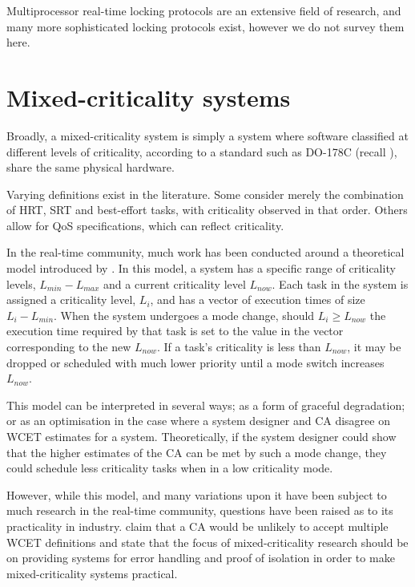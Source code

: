 Multiprocessor real-time locking protocols are an extensive field of research, and 
many more sophisticated locking protocols exist, however we do not survey them here.

\section{Mixed-criticality systems}
\label{s:mixed-criticality}

Broadly, a mixed-criticality system is simply a system where software classified at different levels
of criticality, according to a standard such as DO-178C (recall ), share
the same physical hardware. 

Varying definitions exist in the literature. Some consider merely
the combination of \gls{HRT}, \gls{SRT} and best-effort tasks, with criticality observed in that order.
Others allow for \gls{QoS} specifications, which can reflect criticality. 

In the real-time community, much work has been
conducted around a theoretical model introduced by \citet{Vestal_07}. In this model, a system has
a specific range of criticality levels, $L_{min}-L_{max}$ and a current criticality level
$L_{now}$. Each task in the system is assigned a criticality level, $L_{i}$, and has a vector of
execution times of size $L_{i}-L_{min}$. When the system undergoes a mode change, should $L_{i}
\geq L_{now}$ the execution time required by that task is set to the value in the vector
corresponding to the new $L_{now}$. If a task's criticality is less than $L_{now}$, it may be dropped
or scheduled with much lower priority until a mode switch increases $L_{now}$. 

This model can be interpreted in several ways; as a form of graceful degradation; or as an
optimisation in the case where a system designer and \gls{CA} disagree on \gls{WCET}
estimates for a system. Theoretically, if the system designer could show that the higher estimates
of the \gls{CA} can be met by such a mode change, they could schedule less criticality tasks when in
a low criticality mode. 

However, while this model, and many variations upon it have been subject to much research in the
real-time community, questions have been raised as to its practicality in industry.
\citet{Ernst_DiNatale_16} claim that a \gls{CA} would be unlikely to accept multiple \gls{WCET}
definitions and state that the focus of mixed-criticality research should be on providing systems
for error handling and proof of isolation in order to make mixed-criticality systems practical. 

